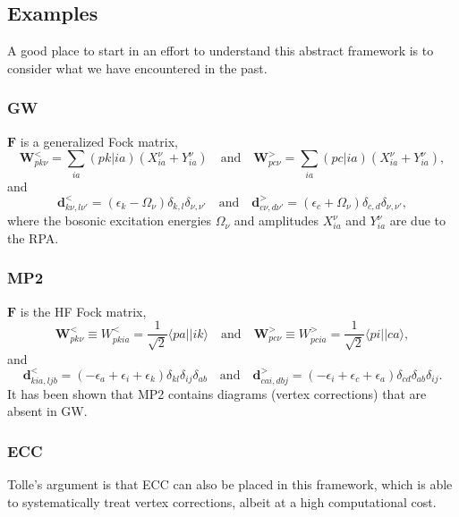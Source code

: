 \subsection{Examples}
A good place to start in an effort to understand this abstract framework is to consider what we have encountered in the past. 
\subsubsection{GW}
$\bm{F}$ is a generalized Fock matrix,
\begin{equation}
    \bm{W}^<_{pk\nu} = \sum_{ia} (pk|ia) \left( X_{ia}^{\nu} + Y_{ia}^{\nu} \right) \quad \text{and} \quad \bm{W}^>_{pc\nu} = \sum_{ia} (pc|ia) \left( X_{ia}^{\nu} + Y_{ia}^{\nu} \right),
\end{equation}
and 
\begin{equation}
    \bm{d}^<_{k\nu , l\nu'} = \left(\epsilon_k - \Omega_\nu\right) \delta_{k,l} \delta_{\nu,\nu'} \quad \text{and} \quad \bm{d}^>_{c\nu , d\nu'} = \left(\epsilon_c + \Omega_\nu\right) \delta_{c,d} \delta_{\nu,\nu'},
\end{equation}
where the bosonic excitation energies $\Omega_\nu$ and amplitudes $X_{ia}^\nu$ and $Y_{ia}^\nu$ are due to the RPA.
\subsubsection{MP2}
$\bm{F}$ is the HF Fock matrix,
\begin{equation}
\bm{W}^<_{pk\nu} \equiv W^<_{pkia} = \frac{1}{\sqrt{2}}\langle p a||i k\rangle \quad \text{and} \quad \bm{W}^>_{pc\nu} \equiv W^>_{pcia} = \frac{1}{\sqrt{2}}\langle p i||c a\rangle,
\end{equation}
and
\begin{equation}
\bm{d}^<_{k i a, l j b} = \left(-\epsilon_a+\epsilon_i+\epsilon_k\right) \delta_{k l} \delta_{i j} \delta_{a b} \quad \text{and} \quad \bm{d}^>_{c a i, d b j} = \left(-\epsilon_i+\epsilon_c+\epsilon_a\right) \delta_{c d} \delta_{a b} \delta_{i j}.
\end{equation}
It has been shown that MP2 contains diagrams (vertex corrections) that are absent in GW.
\subsubsection{ECC}
Tolle's argument is that ECC can also be placed in this framework, which is able to systematically treat vertex corrections, albeit at a high computational cost.
